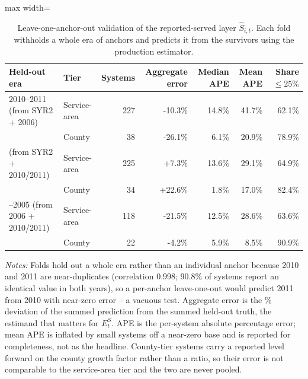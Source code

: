 \begin{table}[ht]
\centering
\caption{Leave-one-anchor-out validation of the reported-served layer $\hat S_{i,t}$. Each fold withholds a whole era of anchors and predicts it from the survivors using the production estimator.}
\label{tab:backcast_loao}
\begin{adjustbox}{max width=\textwidth}
\begin{tabular}{llrrrrr}
\toprule
Held-out era & Tier & Systems & Aggregate error & Median APE & Mean APE & Share $\le\!25\%$ \\
\midrule
2010--2011 (from SYR2 + 2006) & Service-area & 227 & -10.3\% & 14.8\% & 41.7\% & 62.1\% \\
 & County & 38 & -26.1\% & 6.1\% & 20.9\% & 78.9\% \\
\addlinespace
2006 (from SYR2 + 2010/2011) & Service-area & 225 & +7.3\% & 13.6\% & 29.1\% & 64.9\% \\
 & County & 34 & +22.6\% & 1.8\% & 17.0\% & 82.4\% \\
\addlinespace
1998--2005 (from 2006 + 2010/2011) & Service-area & 118 & -21.5\% & 12.5\% & 28.6\% & 63.6\% \\
 & County & 22 & -4.2\% & 5.9\% & 8.5\% & 90.9\% \\
\bottomrule
\end{tabular}
\end{adjustbox}
\begin{minipage}{\textwidth}\footnotesize\raggedright
\vspace{0.5em}
\textit{Notes:} Folds hold out a whole era rather than an individual anchor because 2010 and 2011 are near-duplicates (correlation 0.998; 90.8\% of systems report an identical value in both years), so a per-anchor leave-one-out would predict 2011 from 2010 with near-zero error -- a vacuous test. Aggregate error is the \% deviation of the summed prediction from the summed held-out truth, the estimand that matters for $E^S_t$. APE is the per-system absolute percentage error; mean APE is inflated by small systems off a near-zero base and is reported for completeness, not as the headline. County-tier systems carry a reported level forward on the county growth factor rather than a ratio, so their error is not comparable to the service-area tier and the two are never pooled.
\end{minipage}
\end{table}
